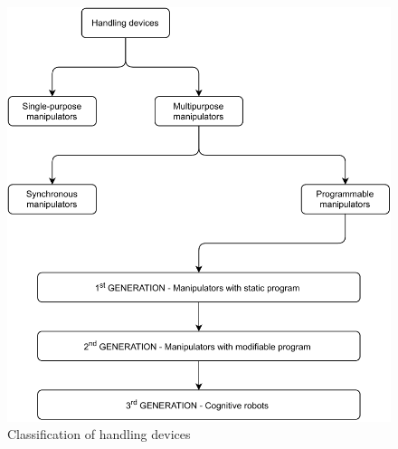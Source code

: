 \begin{figure}[h]
    \centering
    \includegraphics[width=0.8\linewidth]{img/manipulators.pdf}
    \caption[Classification of handling devices]{Classification of handling devices \protect\cite{vsb_2007}}
    \label{fig:manipulators}
\end{figure}


